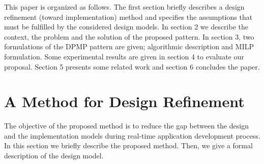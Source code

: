 \documentclass[runningheads,a4paper]{llncs}
\begin{document}
This paper is organized as follows. The first section briefly describes a design refinement (toward implementation) method and specifies the assumptions that must be fulfilled by the considered design models. In section 2 we describe the context, the problem and the solution of the proposed pattern. In section 3, two formulations of the DPMP pattern are given; algorithmic description and MILP formulation. Some experimental results are given in section 4 to evaluate our proposal. Section 5 presents some related work and section 6 concludes the paper. 

\section{A Method for Design Refinement}

The objective of the proposed method is to reduce the gap between the design and the implementation models during real-time application development process. In this section we briefly describe the proposed method. Then, we give a formal description of the design model.  
\end{document}
